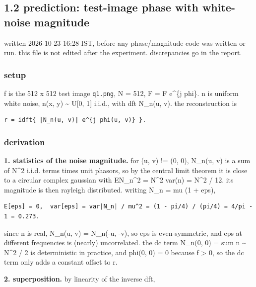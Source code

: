 \subsection{1.2 prediction: test-image phase with white-noise magnitude}\label{app:pred-phase}

written 2026-10-23 16:28 IST, before any phase/magnitude code was written or run. this file is not edited after the experiment. discrepancies go in the report.

\subsubsection*{setup}

f is the 512 x 512 test image \texttt{q1.png}, N = 512, F = \textbar{}F\textbar{} e\textasciicircum{}\{j phi\}. n is uniform white noise, n(x, y) \textasciitilde{} U[0, 1] i.i.d., with dft N\_n(u, v). the reconstruction is

\begin{verbatim}
r = idft{ |N_n(u, v)| e^{j phi(u, v)} }.
\end{verbatim}

\subsubsection*{derivation}

\textbf{1. statistics of the noise magnitude.} for (u, v) != (0, 0), N\_n(u, v) is a sum of N\textasciicircum{}2 i.i.d. terms times unit phasors, so by the central limit theorem it is close to a circular complex gaussian with E\textbar{}N\_n\textbar{}\textasciicircum{}2 = N\textasciicircum{}2 var(n) = N\textasciicircum{}2 / 12. its magnitude is then rayleigh distributed. writing \textbar{}N\_n\textbar{} = mu (1 + eps),

\begin{verbatim}
E[eps] = 0,  var[eps] = var|N_n| / mu^2 = (1 - pi/4) / (pi/4) = 4/pi - 1 = 0.273.
\end{verbatim}

since n is real, \textbar{}N\_n(u, v)\textbar{} = \textbar{}N\_n(-u, -v)\textbar{}, so eps is even-symmetric, and eps at different frequencies is (nearly) uncorrelated. the dc term N\_n(0, 0) = sum n \textasciitilde{} N\textasciicircum{}2 / 2 is deterministic in practice, and phi(0, 0) = 0 because f \textgreater{} 0, so the dc term only adds a constant offset to r.

\textbf{2. superposition.} by linearity of the inverse dft,

